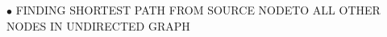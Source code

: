 \documentclass[preview]{standalone}
\begin{document}
\begin{center}
$\bullet$ FINDING SHORTEST PATH FROM SOURCE NODE\n TO ALL OTHER NODES IN UNDIRECTED GRAPH
\end{center}
\end{document}
